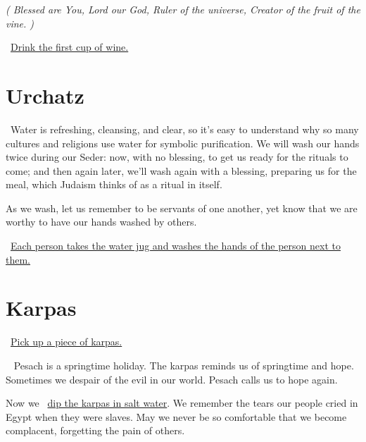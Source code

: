 \documentclass[12pt]{article}
\newenvironment{unreadHebrewTranslation}{\itshape(\hspace{-0.2em}}{\hspace{-0.2em})\par}
\newcommand{\god}{God}
\newcommand{\translateBaruchAdonai}{Blessed are You, Lord our \god}
\newcommand{\translateBaruchHaolam}{{\translateBaruchAdonai}, Ruler of the universe}
\newcommand{\translateBaruchHagafen}{{\translateBaruchHaolam}, Creator of the fruit of the vine.}
\newcommand{\inlineSederAction}[1]{\faHandORight{}~\underline{#1}}
\newcommand{\sederAction}[1]{\inlineSederAction{#1}\par}
\newcommand{\sederSection}[2]{
    \section*{#1 \Huge\cjRL{#2}}
}
\newcommand{\newReading}{\faBook{}\ }
\begin{document}
\begin{minipage}[t]{\textwidth}
    \begin{unreadHebrewTranslation}
        {\translateBaruchHagafen}
    \end{unreadHebrewTranslation}

    \sederAction{Drink the first cup of wine.}
\end{minipage}

\sederSection{Urchatz}{Ur:.ha.s}
\newReading Water is refreshing, cleansing, and clear, so it’s easy to understand why so many cultures and religions use water for symbolic purification. We will wash our hands twice during our Seder: now, with no blessing, to get us ready for the rituals to come; and then again later, we’ll wash again with a blessing, preparing us for the meal, which Judaism thinks of as a ritual in itself.

As we wash, let us remember to be servants of one another, yet know that we are worthy to have our hands washed by others.

\sederAction{Each person takes the water jug and washes the hands of the person next to them.}

\sederSection{Karpas}{k*ar:p*as}
\sederAction{Pick up a piece of karpas.}
\newReading %
Pesach is a springtime holiday. The karpas reminds us of springtime and hope. Sometimes we despair of the evil in our world. Pesach calls us to hope again.
\par Now we \inlineSederAction{dip the karpas in salt water}. We remember the tears our people cried in Egypt when they were slaves. May we never be so comfortable that we become complacent, forgetting the pain of others.
\end{document}

